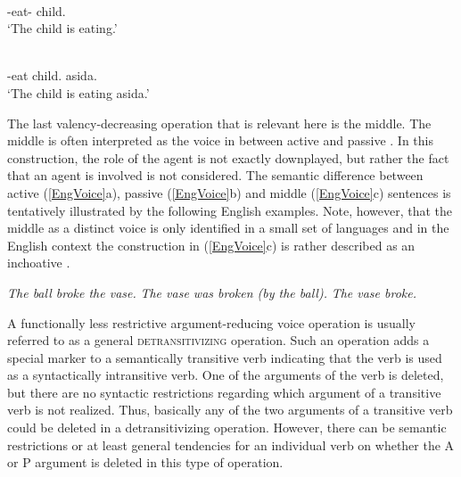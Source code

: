 \begin{exe}\ex\label{TenAntiPassive}
\begin{xlist}
\ex\gll{} \\
\ipfv{}-eat-\antip{} child.\nom{}\\
\glt `The child is eating.' 

\ex\gll{}  \\
\ipfv{}-eat child.\nom{} asida.\acc{}\\
\glt `The child is eating asida.' 
\end{xlist}
\end{exe}

The last valency-decreasing operation that is relevant here is the middle.
The middle is often interpreted as the voice in between active and passive \citep[3--4]{Klaiman:1991}. 
In this construction, the role of the agent is not exactly downplayed, but rather the fact that an agent is involved is not considered. 
The semantic difference between active (\ref{EngVoice}a), passive (\ref{EngVoice}b) and middle (\ref{EngVoice}c) sentences is tentatively illustrated by the following English examples. Note, however, that the middle as a distinct voice is only identified in a small set of languages and in the English context the construction in (\ref{EngVoice}c) is rather described as an inchoative \citep[2--3]{Levin:1993}. 

\begin{exe}\ex\label{EngVoice}
\begin{xlist}
\ex \textit{The ball broke the vase.}
\ex \textit{The vase was broken (by the ball).}
\ex \textit{The vase broke.}
\end{xlist}
\end{exe}

A functionally less restrictive argument-reducing voice operation is usually referred to as a general \textsc{detransitivizing} operation.
Such an operation adds a special marker to a semantically transitive verb indicating that the verb is used as a syntactically intransitive verb. 
One of the arguments of the verb is deleted, but there are no syntactic restrictions regarding which argument of a transitive verb is not realized. 
Thus, basically any of the two arguments of a transitive verb could be deleted in a detransitivizing operation. 
However, there can be semantic restrictions or at least general tendencies for an individual verb on whether the A or P argument is deleted in this type of operation. 

